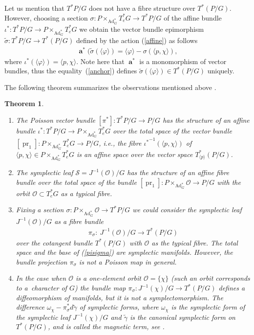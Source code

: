 \documentclass[pdftex]{sigma}
\renewcommand{\O}{\mathcal{O}}
\renewcommand{\S}{\mathcal{S}}
\renewcommand{\to}{\rightarrow}
\DeclareMathOperator{\Ad}{Ad}
\DeclareMathOperator{\anch}{\mathbf{a}}
\numberwithin{equation}{section}
\newtheorem{Theorem}{Theorem}[section]
\begin{document}
Let us mention that $T^*P/G$ does not have a f\/ibre structure over $T^*(P/G)$. However, choosing a section $\sigma\colon P\times _{\Ad_G^*}T^*_eG\to T^*P/G$ of the af\/f\/ine bundle ${\iota^*}\colon T^*P/G\to P\times _{\Ad_G^*}T^*_eG$ we obtain the vector bundle epimorphism $\tilde\sigma\colon T^*P/G\to T^*(P/G)$ def\/ined by the action (\ref{affine}) as follows
\begin{gather}\label{anchor}\anch^*(\tilde\sigma(\langle\varphi\rangle)
=\langle\varphi\rangle-\sigma(\langle p,\chi\rangle),\end{gather}
where $\iota^*(\langle \varphi\rangle)=\langle p,\chi\rangle$. Note here that $\anch^*$ is a monomorphism of vector bundles, thus the equali\-ty~(\ref{anchor}) def\/ines $\tilde\sigma(\langle\varphi\rangle)\in T^*(P/G)$ uniquely.

The following theorem summarizes the observations mentioned above .
 \begin{Theorem}\label{prop:lavessympl}\quad
\begin{enumerate}\itemsep=0pt
\item[$(i)$] The Poisson vector bundle $[\pi^*]\colon T^*P/G\to P/G$ has the structure of an affine bundle $\iota^*\colon T^*P/G\to P\times _{\Ad_G^*} T^*_eG$ over the total space of the vector bundle $[\operatorname{pr}_1]\colon P\times _{\Ad_G^*} T^*_eG\to P/G$, i.e., the fibre ${\iota^*}^{-1}(\langle p,\chi\rangle)$ of $\langle p,\chi\rangle\in P\times _{\Ad_G^*} T^*_eG$ is an affine space over the vector space $T^*_{\langle p\rangle}(P/G)$.
\item[$(ii)$] The symplectic leaf $\S=J^{-1}(\O)/G$ has the structure of an affine fibre bundle over the total space of the bundle $[\operatorname{pr}_1]\colon P\times _{\Ad_G^*} \O\to P/G$ with the orbit $\O\subset T^*_eG$ as a typical fibre.
\item[$(iii)$] Fixing a section $\sigma\colon P\times _{\Ad^*_G}\O\to T^*P/G$ we could consider the symplectic leaf $J^{-1}(\O)/G$ as a fibre bundle
 \begin{gather}\label{pisigma} \pi_\sigma\colon \ J^{-1}(\O)/G\to T^*(P/G)\end{gather}
 over the cotangent bundle $T^*(P/G)$ with $\O$ as the typical fibre. The total space and the base of {\rm (\ref{pisigma})} are symplectic manifolds. However, the bundle projection $\pi_\sigma$ is not a Poisson map in general.
\item[$(iv)$] In the case when $\O$ is a one-element orbit $\O=\{\chi\}$ (such an orbit corresponds to a~character of $G$) the bundle map $\pi_\sigma\colon J^{-1}(\chi)/G\to T^*(P/G)$ defines a diffeomorphism of manifolds, but it is not a symplectomorphism. The difference $\omega_\chi-\pi_\sigma^*d\tilde\gamma$ of symplectic forms, where $ \omega_\chi$ is the symplectic form of the symplectic leaf $J^{-1}(\chi)/G$ and $\tilde\gamma$ is the canonical symplectic form on $T^*(P/G)$, and is called the magnetic term, see {\rm \cite{Stern,Weinstein:1977}}.
\end{enumerate}
\end{Theorem}
\end{document}
